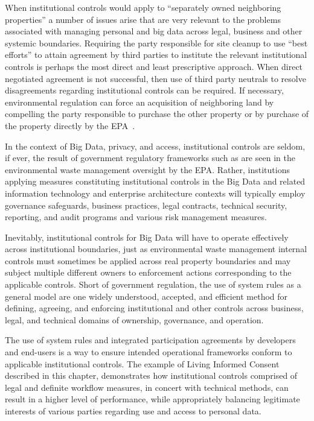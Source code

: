 When institutional controls would apply to ``separately owned neighboring properties'' a number of issues arise that are very relevant to the problems associated with managing personal and big data across legal, business and other systemic boundaries.
Requiring the party responsible for site cleanup to use ``best efforts'' to attain agreement by third parties to institute the relevant institutional controls is perhaps the most direct and least prescriptive approach.  When direct negotiated agreement is not successful, then use of third party neutrals to resolve disagreements regarding institutional controls can be required.  If necessary, environmental regulation can force an acquisition of neighboring land by compelling the party responsible to purchase the other property or by purchase of the property directly by the EPA~\cite{EPA-540-R-09-001}.

In the context of Big Data, privacy, and access, institutional controls are seldom, if ever, the result of government regulatory frameworks such as are seen in the environmental waste management oversight by the EPA.
Rather, institutions applying measures constituting institutional controls in the Big Data and related information technology and enterprise architecture contexts will typically employ governance safeguards, business practices, legal contracts, technical security, reporting, and audit programs and various risk management measures.

Inevitably, institutional controls for Big Data will have to operate effectively across institutional boundaries, just as environmental waste management internal controls must sometimes be applied across real property boundaries and may subject multiple different owners to enforcement actions corresponding to the applicable controls.
Short of government regulation, the use of system rules as a general model are one widely understood, accepted, and efficient method for defining, agreeing, and enforcing institutional and other controls across business, legal, and technical domains of ownership, governance, and operation.

The use of system rules and integrated participation agreements by developers and end-users is a way to ensure intended operational frameworks conform to applicable institutional controls.
The example of Living Informed Consent described in this chapter, demonstrates how institutional controls comprised of legal and definite workflow measures, in concert with technical methods, can result in a higher level of performance, while appropriately balancing legitimate interests of various parties regarding use and access to personal data.

